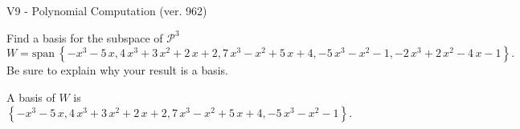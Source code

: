 \begin{exercise}
  \begin{exerciseTitle}V9 - Polynomial Computation (ver. 962)\end{exerciseTitle}
  \begin{exerciseStatement}
    Find a basis for the subspace of \(\mathcal{P}^3\) 
\[W=\mathrm{span}\ \left\{-x^{3} - 5 \, x , 4 \, x^{3} + 3 \, x^{2} + 2 \, x + 2 , 7 \, x^{3} - x^{2} + 5 \, x + 4 , -5 \, x^{3} - x^{2} - 1 , -2 \, x^{3} + 2 \, x^{2} - 4 \, x - 1\right\}.\]
 Be sure to explain why your result is a basis.


  \end{exerciseStatement}
  \begin{exerciseAnswer}
   A basis of \(W\) is  \(\left\{-x^{3} - 5 \, x , 4 \, x^{3} + 3 \, x^{2} + 2 \, x + 2 , 7 \, x^{3} - x^{2} + 5 \, x + 4 , -5 \, x^{3} - x^{2} - 1\right\}\).
  


  \end{exerciseAnswer}
\end{exercise}